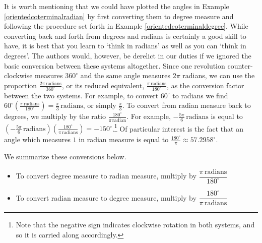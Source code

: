 \documentclass[12pt]{ximera}
\begin{document}
It is worth mentioning that we could have plotted the angles in Example \ref{orientedcoterminalradian} by first converting them to degree measure and following the procedure set forth in Example \ref{orientedcoterminaldegree}.  While converting back and forth from degrees and radians is certainly a good skill to have, it is best that you learn to `think in radians' as well as you can `think in degrees'.  The authors would, however, be derelict in our duties if we ignored the basic conversion between these systems altogether.  Since one revolution counter-clockwise measures $360^{\circ}$ and the same angle measures $2 \pi$ radians, we can use the proportion $\frac{2 \pi \, \text{radians}}{360^{\circ}}$, or its reduced equivalent, $\frac{\pi \, \text{radians}}{180^{\circ}}$, as the conversion factor between the two systems.  For example, to convert $60^{\circ}$ to radians we find $60^{\circ} \left( \frac{\pi \, \text{radians}}{180^{\circ}}\right) = \frac{\pi}{3} \, \text{radians}$, or simply $\frac{\pi}{3}$.  To convert from radian measure back to degrees, we multiply by the ratio $\frac{180^{\circ}}{\pi \, \text{radian}}$.  For example,  $-\frac{5 \pi}{6} \, \text{radians}$ is equal to $\left(-\frac{5 \pi}{6} \, \text{radians} \right) \left( \frac{180^{\circ}}{\pi \, \text{radians}}\right) = -150^{\circ}$.\footnote{Note that the negative sign indicates clockwise rotation in both systems, and so it is carried along accordingly.}   Of particular interest is the fact that an angle which measures $1$ in radian measure is equal to $\frac{180^{\circ}}{\pi}  \approx 57.2958^{\circ}$.  

We summarize these conversions below.

\medskip



\begin{itemize}

\item  To convert degree measure to radian measure, multiply by $\dfrac{\pi \, \text{radians}}{180^{\circ}}$

\item  To convert radian measure to degree measure, multiply by $\dfrac{180^{\circ}}{\pi \, \text{radians}}$

\end{itemize}

\smallskip
\end{document}
